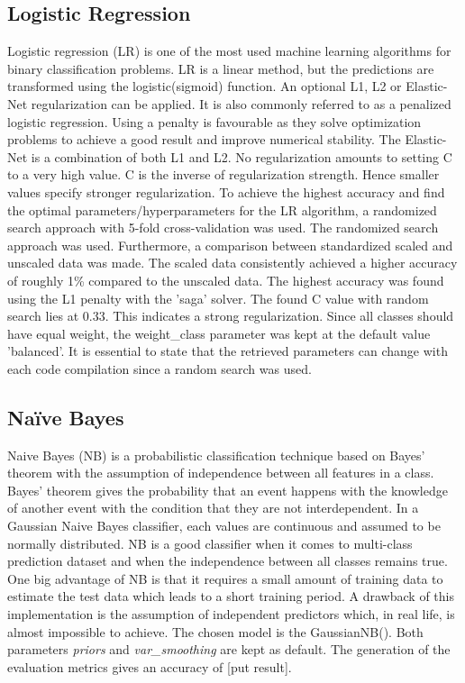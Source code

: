 \documentclass[11pt]{article}
\begin{document}
	\subsection{Logistic Regression}
	Logistic regression (LR) is one of the most used machine learning algorithms for binary classification problems. LR is a linear method, but the predictions are transformed using the logistic(sigmoid) function. An optional L1, L2 or Elastic-Net regularization can be applied. It is also commonly referred to as a penalized logistic regression. Using a penalty is favourable as they solve optimization problems to achieve a good result and improve numerical stability. The Elastic-Net is a combination of both L1 and L2.  No regularization amounts to setting C to a very high value. C is the inverse of regularization strength. Hence smaller values specify stronger regularization.
	To achieve the highest accuracy and find the optimal parameters/hyperparameters for the LR algorithm, a randomized search approach with 5-fold cross-validation was used. The randomized search approach was used. Furthermore, a comparison between standardized scaled and unscaled data was made. The scaled data consistently achieved a higher accuracy of roughly 1\% compared to the unscaled data. The highest accuracy was found using the L1 penalty with the 'saga' solver. The found C value with random search lies at 0.33. This indicates a strong regularization. Since all classes should have equal weight, the weight\_class parameter was kept at the default value 'balanced'. It is essential to state that the retrieved parameters can change with each code compilation since a random search was used.
	
	\subsection{Naïve Bayes}
	Naive Bayes (NB) is a probabilistic classification technique based on Bayes’ theorem with the assumption of independence between all features in a class. Bayes’ theorem gives the probability that an event happens with the knowledge of another event with the condition that they are not interdependent. In a Gaussian Naive Bayes classifier, each values are continuous and assumed to be normally distributed.
	\medbreak
	NB is a good classifier when it comes to multi-class prediction dataset and when the independence between all classes remains true. One big advantage of NB is that it requires a small amount of training data to estimate the test data which leads to a short training period. A drawback of this implementation is the assumption of independent predictors which, in real life, is almost impossible to achieve. 
	\medbreak
	The chosen model is the GaussianNB(). Both parameters \textit{priors} and \textit{var\_smoothing} are kept as default. The generation of the evaluation metrics gives an accuracy of [put result].
\end{document}
